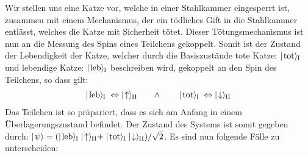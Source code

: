 Wir stellen uns eine Katze vor, welche in einer Stahlkammer eingesperrt ist, zusammen mit einem Mechanismus, der ein tödliches Gift in die Stahlkammer entlässt, welches die Katze mit Sicherheit tötet. Dieser Tötungsmechanismus ist nun an die Messung des Spins eines Teilchens gekoppelt. Somit ist der Zustand der Lebendigkeit der Katze, welcher durch die Basiszustände tote Katze: $\mid\!\!\!\,\,{\text{tot}}\rangle_{\!\!\;\text{I}}$ und lebendige Katze: $\mid\!\!\!\,\,{\text{leb}}\rangle_{\!\!\;\text{I}}$ beschreiben wird, gekoppelt an den Spin des Teilchens, so dass gilt: 
\begin{eqnarray*}
	\ketI{\text{leb}} \;\Leftrightarrow\; \ketII{\uparrow} \qquad\land\qquad\ketI{\text{tot}} \;\Leftrightarrow\; \ketII{\downarrow}
\end{eqnarray*}
Das Teilchen ist so präpariert, dass es sich am Anfang in einem Überlagerungszustand befindet. Der Zustand des Systems ist somit gegeben durch: $\ket{\psi}=(\ketI{\text{leb}}\ketII{\uparrow}+\ketI{\text{tot}}\ketII{\downarrow})/\sqrt{2}$. Es sind nun folgende Fälle zu unterscheiden: 
